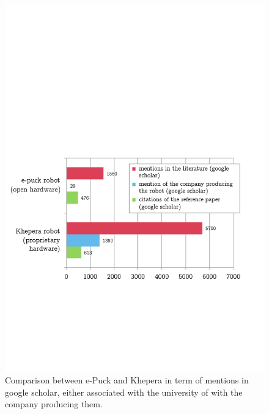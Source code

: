 \documentclass[letterpaper, 10 pt, conference]{ieeeconf}  %
\begin{document}
\begin{figure}
\centering
\includegraphics[width=\columnwidth]{figures/others_robots}
\caption{Comparison between e-Puck and Khepera in term of mentions in google scholar, either associated with the university of with the company producing them.
}
\label{fig:khepuck}
\end{figure}
\end{document}
